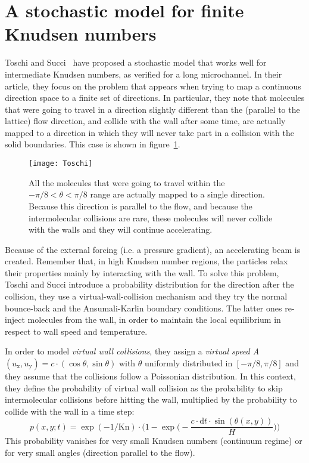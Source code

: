 \section{A stochastic model for finite Knudsen numbers}
Toschi and Succi~\cite{Toschi2005} have proposed a stochastic model that
works well for intermediate Knudsen numbers, as verified for a long microchannel. 
In their article, they focus on the problem
that appears when trying to map a continuous direction space to a finite set of
directions. In particular, they note that molecules that were going to travel in
a direction slightly different than the (parallel to the lattice) flow direction,
and collide with the wall after some time, are actually mapped to a direction
in which they will never take part in a collision with the solid boundaries.
This case is shown in figure~\ref{fig:Toschi}. 

\begin{figure}[h!]%
 	\begin{center}%
 		\texttt{[image: Toschi]}%
 		\caption{All the molecules that were going to travel within the %
 		$-\pi/8 < \theta < \pi/8$ range are actually mapped to %
 		a single direction. Because this direction is parallel to the flow, %
 		and because the intermolecular collisions are rare, these molecules %
 		will never collide with the walls and they will continue accelerating.~\cite{Toschi2005}}%
 		\label{fig:Toschi}%
 	\end{center}%
\end{figure}

Because of the external forcing (i.e. a pressure gradient), an accelerating beam
is created. Remember that, in high Knudsen number regions, the particles relax their
properties mainly by interacting with the wall. 
To solve this problem, Toschi and Succi introduce a probability distribution
for the direction after the collision, they use a virtual-wall-collision mechanism and they
try the normal bounce-back and the Ansumali-Karlin boundary conditions.
The latter ones re-inject molecules from the wall, in order to maintain the
local equilibrium in respect to wall speed and temperature.

In order to model \textit{virtual wall collisions}, they assign a \textit{virtual speed A}
$(u_\mathrm{x}, u_\mathrm{y}) = c \cdot (\cos \theta, \sin \theta)$ with $\theta$
uniformly distributed in $[-\pi/8 , \pi/8]$ and they assume that the collisions
follow a Poissonian distribution. In this context, they define the probability
of virtual wall collision as the probability to skip intermolecular collisions before hitting
the wall, multiplied by the probability to collide with the wall in a time step:
\begin{equation}
 p(x, y; t) = \exp( -1/\mathrm{Kn} ) \cdot \Big( 1 - \exp \Big( - \frac{c \cdot \mathrm{d}t \cdot \sin(\theta(x,y))}{H} \Big)   \Big)
\end{equation}
This probability vanishes for very small Knudsen numbers (continuum regime)
or for very small angles (direction parallel to the flow).

